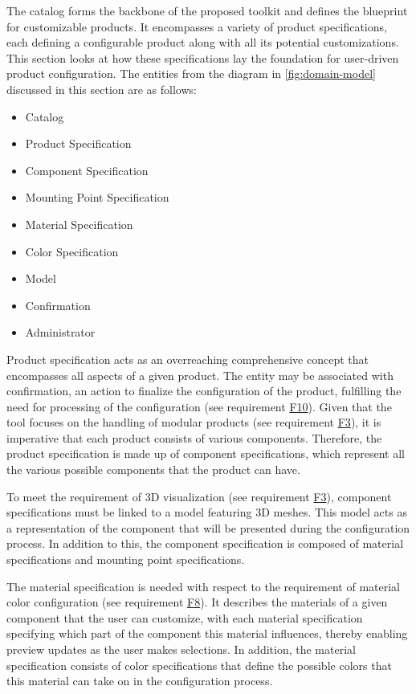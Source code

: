 The catalog forms the backbone of the proposed toolkit and defines the blueprint for customizable products. It encompasses a variety of product specifications, each defining a configurable product along with all its potential customizations. This section looks at how these specifications lay the foundation for user-driven product configuration.
The entities from the diagram in \autoref{fig:domain-model} discussed in this section are as follows:
\begin{itemize}[label=\rectanglebullet]
    \item Catalog
    \item Product Specification
    \item Component Specification
    \item Mounting Point Specification
    \item Material Specification
    \item Color Specification
    \item Model
    \item Confirmation
    \item Administrator
\end{itemize}

Product specification acts as an overreaching comprehensive concept that encompasses all aspects of a given product. The entity may be associated with confirmation, an action to finalize the configuration of the product, fulfilling the need for processing of the configuration (see requirement \hyperref[itm:F10]{F10}). Given that the tool focuses on the handling of modular products (see requirement \hyperref[itm:F3]{F3}), it is imperative that each product consists of various components. Therefore, the product specification is made up of component specifications, which represent all the various possible components that the product can have.

To meet the requirement of 3D visualization (see requirement \hyperref[itm:F3]{F3}), component specifications must be linked to a model featuring 3D meshes. This model acts as a representation of the component that will be presented during the configuration process. In addition to this, the component specification is composed of material specifications and mounting point specifications.

The material specification is needed with respect to the requirement of material color configuration (see requirement \hyperref[itm:F8]{F8}). It describes the materials of a given component that the user can customize, with each material specification specifying which part of the component this material influences, thereby enabling preview updates as the user makes selections. In addition, the material specification consists of color specifications that define the possible colors that this material can take on in the configuration process.

